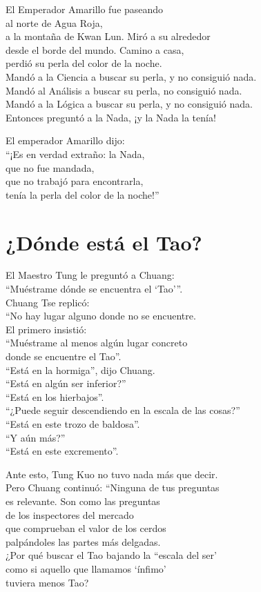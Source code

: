 \documentclass[book,b5paper,hidelinks,final]{memoir}
\begin{document}
	El Emperador Amarillo fue paseando\\
	al norte de Agua Roja,\\
	a la montaña de Kwan Lun. Miró a su alrededor\\
	desde el borde del mundo. Camino a casa,\\
	perdió su perla del color de la noche.\\
	Mandó a la Ciencia a buscar su perla, y no consiguió nada.\\
	Mandó al Análisis a buscar su perla, no consiguió nada.\\
	Mandó a la Lógica a buscar su perla, y no consiguió nada.\\
	Entonces preguntó a la Nada, ¡y la Nada la tenía!
	
	El emperador Amarillo dijo:\\
	``¡Es en verdad extraño: la Nada,\\
	que no fue mandada,\\
	que no trabajó para encontrarla,\\
	tenía la perla del color de la noche!''
	
	\chapter*{¿Dónde está el Tao?}
	
	El Maestro Tung le preguntó a Chuang:\\
	``Muéstrame dónde se encuentra el `Tao'''.\\
	Chuang Tse replicó:\\
	``No hay lugar alguno donde no se encuentre.\\
	El primero insistió:\\
	``Muéstrame al menos algún lugar concreto\\
	donde se encuentre el Tao''.\\
	``Está en la hormiga'', dijo Chuang.\\
	``Está en algún ser inferior?''\\
	``Está en los hierbajos''.\\
	``¿Puede seguir descendiendo en la escala de las cosas?''\\
	``Está en este trozo de baldosa''.\\
	``Y aún más?''\\
	``Está en este excremento''.
	
	Ante esto, Tung Kuo no tuvo nada más que decir.\\
	Pero Chuang continuó: ``Ninguna de tus preguntas\\
	es relevante. Son como las preguntas\\
	de los inspectores del mercado\\
	que comprueban el valor de los cerdos\\
	palpándoles las partes más delgadas.\\
	¿Por qué buscar el Tao bajando la ``escala del ser'\\
	como si aquello que llamamos `ínfimo'\\
	tuviera menos Tao?
	
\end{document}
